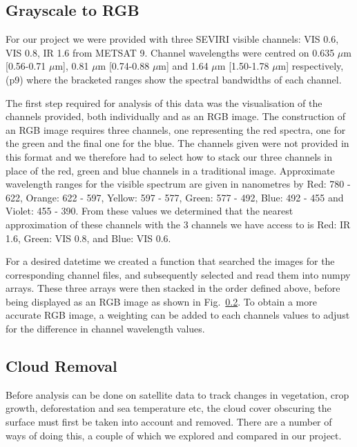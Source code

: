 \subsection{Grayscale to RGB}
For our project we were provided with three SEVIRI visible channels: VIS 0.6, VIS 0.8, IR 1.6 %
from METSAT 9. Channel wavelengths were centred on 0.635 $\mu$m [0.56-0.71 $\mu$m], 0.81 $\mu$m [0.74-0.88 $\mu$m] and 1.64 $\mu$m [1.50-1.78 $\mu$m] respectively, (p9) where the bracketed ranges show the spectral bandwidths of each channel. 
\par The first step required for analysis of this data was the visualisation of the channels provided, both individually and as an RGB image. The construction of an RGB image requires three channels, one representing the red spectra, one for the green and the final one for the blue. The channels given were not provided in this format and we therefore had to select how to stack our three channels in place of the red, green and blue channels in a traditional image. Approximate wavelength ranges for the visible spectrum are given in nanometres by Red: 780 - 622, Orange: 622 - 597, Yellow: 597 - 577, Green: 577 - 492, Blue: 492 - 455 and Violet: 455 - 390. %
From these values we determined that the nearest approximation of these channels with the 3 channels we have access to is Red: IR 1.6, Green: VIS 0.8, and Blue: VIS 0.6. 
\par For a desired datetime we created a function that searched the images for the corresponding channel files, and subsequently selected and read them into numpy arrays. These three arrays were then stacked in the order defined above, before being displayed as an RGB image as shown in Fig.~\ref{}. To obtain a more accurate RGB image, a weighting can be added to each channels values to adjust for the difference in channel wavelength values. 
\subsection{Cloud Removal}
 Before analysis can be done on satellite data to track changes in vegetation, crop growth, deforestation and sea temperature etc, the cloud cover obscuring the surface must first be taken into account and removed. There are a number of ways of doing this, a couple of which we explored and compared in our project. 
